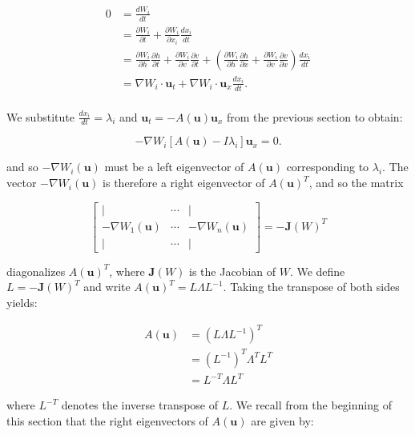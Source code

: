 \begin{align*}
    0 &= \frac{d W_i}{dt} \\
      &= \frac{\partial W_i}{\partial t} + \frac{\partial W_i}{\partial x_i} \frac{dx_i}{dt} \\
      &= \frac{\partial W_i}{\partial h}\frac{\partial h}{\partial t}
       + \frac{\partial W_i}{\partial v}\frac{\partial v}{\partial t}
       + \left(\frac{\partial W_i}{\partial h}\frac{\partial h}{\partial x}
       + \frac{\partial W_i}{\partial v}\frac{\partial v}{\partial x} \right) \frac{dx_i}{dt} \\
      &= \nabla W_i \cdot \textbf{u}_t + \nabla W_i \cdot \textbf{u}_x \frac{dx_i}{dt}. \\
\end{align*}

\noindent We substitute $\frac{d x_i}{dt} = \lambda_i$ and $\textbf{u}_t = -A(\textbf{u}) \textbf{u}_x$ from the 
previous section to obtain:

$$
-\nabla W_i \left[ A(\textbf{u}) - I \lambda_i \right] \textbf{u}_x = 0.
$$

\noindent and so $-\nabla W_i (\textbf{u})$ must be a left eigenvector of $A(\textbf{u})$ corresponding to $\lambda_i$.
The vector $-\nabla W_i (\textbf{u})$ is therefore a right eigenvector of $A(\textbf{u})^T$, and so the matrix

$$
\begin{bmatrix}
    \vert                   & \cdots & \vert \\
    -\nabla W_1(\textbf{u}) & \cdots & -\nabla W_n(\textbf{u})  \\
    \vert                   & \cdots & \vert
\end{bmatrix} = -\textbf{J}(W)^T
$$

\noindent diagonalizes $A(\textbf{u})^T$, where $\textbf{J}(W)$ is the Jacobian of $W$. We define $L = -\textbf{J}(W)^T$
and write $A(\textbf{u})^T = L \Lambda L^{-1}$. Taking the transpose of both sides yields:

\begin{align*}
    A(\textbf{u}) &= \left( L \Lambda L^{-1} \right)^T   \\
                  &= \left(L^{-1}\right)^T \Lambda^T L^T \\
                  &= L^{-T} \Lambda L^T
\end{align*}

\noindent where $L^{-T}$ denotes the inverse transpose of $L$. We recall from the beginning of this section that the 
right eigenvectors of $A(\textbf{u})$ are given by:


